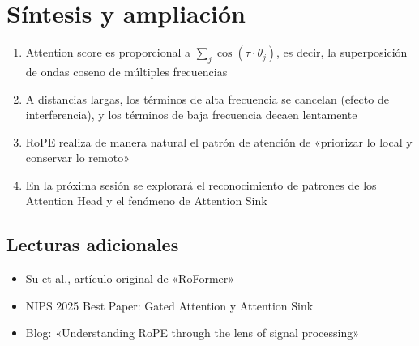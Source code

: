 \documentclass[a4paper]{article}
\begin{document}
\section{Síntesis y ampliación}

\begin{enumerate}
  \item Attention score es proporcional a $\sum_j \cos(\tau \cdot \theta_j)$, es decir, la superposición de ondas coseno de múltiples frecuencias
  \item A distancias largas, los términos de alta frecuencia se cancelan (efecto de interferencia), y los términos de baja frecuencia decaen lentamente
  \item RoPE realiza de manera natural el patrón de atención de «priorizar lo local y conservar lo remoto»
  \item En la próxima sesión se explorará el reconocimiento de patrones de los Attention Head y el fenómeno de Attention Sink
\end{enumerate}

\subsection{Lecturas adicionales}
\begin{itemize}
  \item Su et al., artículo original de «RoFormer»
  \item NIPS 2025 Best Paper: Gated Attention y Attention Sink
  \item Blog: «Understanding RoPE through the lens of signal processing»
\end{itemize}
\end{document}
